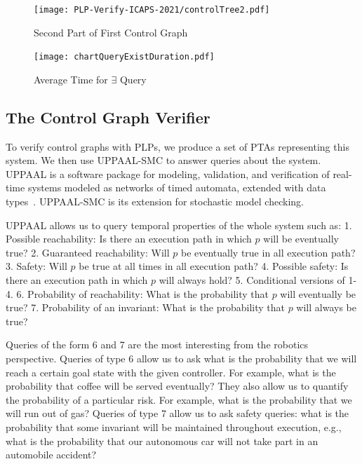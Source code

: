 \documentclass[letterpaper]{article}
\begin{document}

\begin{figure}[]
\centering
\texttt{[image: PLP-Verify-ICAPS-2021/controlTree2.pdf]}
\caption{Second Part of First Control Graph}
\label{fig:controlTree2}
\end{figure}

\begin{figure}[h]
\centering
  \texttt{[image: chartQueryExistDuration.pdf]}
  \caption{Average Time for $\exists$ Query}
  \label{fig:time-exists}
\end{figure}


\subsection{The Control Graph Verifier}
To verify control graphs with PLPs, we produce a set of PTAs representing this system. We then use UPPAAL-SMC  to answer queries about the system. UPPAAL is a software package for modeling, validation, and verification of real-time systems modeled as networks of timed automata, extended with data types~\citep{BehrmannDLHPYH06}. UPPAAL-SMC is its extension for stochastic model checking.


UPPAAL allows us to query temporal properties of the whole system such as: 1. Possible reachability: Is there an execution path in which $p$ will be eventually true? 2. Guaranteed reachability: Will $p$ be eventually true in all execution path? 3. Safety: Will $p$ be true at all times in all execution path? 4. Possible safety: Is there an execution path in which $p$ will always hold? 5.  Conditional versions of 1-4.
6. Probability of reachability: What is the probability that $p$ will eventually be true? 7. Probability of an invariant: What is the probability that $p$ will always be true?

Queries of the form 6 and 7 are the most interesting from the robotics perspective. Queries of type 6 allow us to ask what is the probability that we will reach a certain goal state with the given controller. For example, what is the probability that coffee will be served eventually? They also allow us to quantify the probability of a particular risk.
For example, what is the probability that we will run out of gas? Queries of type 7 allow us to ask safety queries: what is the probability that some invariant will be maintained throughout execution, e.g., what is the probability that our autonomous car will not take part in an automobile accident?
\end{document}
